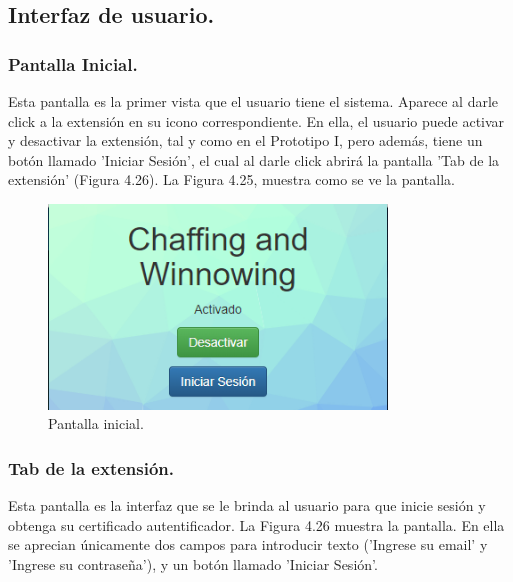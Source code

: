 \documentclass[12pt, a4paper, titlepage]{report}
\begin{document}
    		\subsection{Interfaz de usuario.}
                
                \subsubsection{Pantalla Inicial.}
                Esta pantalla es la primer vista que el usuario tiene el sistema. Aparece al darle click a la extensión en su icono correspondiente. En ella, el usuario puede activar y desactivar la extensión, tal y como en el Prototipo I, pero además, tiene un botón llamado 'Iniciar Sesión', el cual al darle click abrirá la pantalla 'Tab de la extensión' (Figura 4.26). La Figura 4.25, muestra como se ve la pantalla.
                
    		    \begin{figure}[H]
    				\begin{center}	\includegraphics[width=9cm]{./imagenes/Desarrollo/Prototipo_2/UI_inicio.PNG}
    					\caption{Pantalla inicial.}
    				\end{center}
    			\end{figure}
    			
    			\subsubsection{Tab de la extensión.}
    			Esta pantalla es la interfaz que se le brinda al usuario para que inicie sesión y obtenga su certificado autentificador. La Figura 4.26 muestra la pantalla. En ella se aprecian únicamente dos campos para introducir texto ('Ingrese su email' y 'Ingrese su contraseña'), y un botón llamado 'Iniciar Sesión'.
    			  
\end{document}
